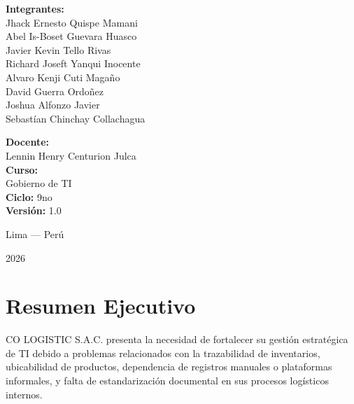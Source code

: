 \documentclass[11pt]{article}
\begin{document}
\begin{titlepage}
  \begin{minipage}[t]{0.55\textwidth}
    \begin{flushleft} \large
      \textbf{Integrantes:}\\
      \smallskip
      \small
      Jhack Ernesto Quispe Mamani\\
      Abel Is-Boset Guevara Huasco\\
      Javier Kevin Tello Rivas\\
      Richard Joseft Yanqui Inocente\\
      Alvaro Kenji Cuti Magaño\\
      David Guerra Ordoñez\\
      Joshua Alfonzo Javier\\
      Sebastían Chinchay Collachagua
    \end{flushleft}
  \end{minipage}
  \hfill
  \begin{minipage}[t]{0.38\textwidth}
    \begin{flushright} \large
      \textbf{Docente:}\\
      \smallskip
      \small Lennin Henry Centurion Julca \\
      \vspace{0.4cm}
      \textbf{Curso:}\\
      \smallskip
      \small Gobierno de TI \\
      \vspace{0.4cm}
      \textbf{Ciclo:} \small 9no \\
      \vspace{0.4cm}
      \textbf{Versión:} \small 1.0
    \end{flushright}
  \end{minipage}
  
  \vfill
  
  {\large Lima --- Perú \par}
  {\large 2026 \par}
\end{titlepage}

\newpage
{}
\thispagestyle{plain}
\tableofcontents
\newpage
{}

\section*{Resumen Ejecutivo}

CO LOGISTIC S.A.C. presenta la necesidad de fortalecer su gestión estratégica de TI debido a problemas relacionados con la trazabilidad de inventarios, ubicabilidad de productos, dependencia de registros manuales o plataformas informales, y falta de estandarización documental en sus procesos logísticos internos.
\end{document}
